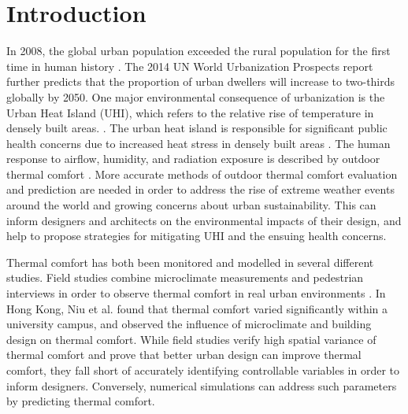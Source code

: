 \documentclass[preprint,3p,12pt,english]{elsarticle}
\begin{document}
\section{Introduction}

In 2008, the global urban population exceeded the rural population for the first time in human history \cite{desa2014world}. The 2014 UN World Urbanization Prospects report further predicts that the proportion of urban dwellers will increase to two-thirds globally by 2050. One major environmental consequence of urbanization is the Urban Heat Island (UHI), which refers to the relative rise of temperature in densely built areas. \cite{kim1992urban, oke1981canyon, oke1973city, bornstein1968observations}. The urban heat island is responsible for significant public health concerns due to increased heat stress in densely built areas \cite{tan2010urban, lo2003land, mavrogianni2011comfort}. The human response to airflow, humidity, and radiation exposure is described by outdoor thermal comfort \cite{pickup_outdoor_2000}. More accurate methods of outdoor thermal comfort evaluation and prediction are needed in order to address the rise of extreme weather events around the world \cite{katz1992extreme, goswami2006increasing} and growing concerns about urban sustainability. This can inform designers and architects on the environmental impacts of their design, and help to propose strategies for mitigating UHI and the ensuing health concerns.

Thermal comfort has both been monitored and modelled in several different studies. Field studies combine microclimate measurements and pedestrian interviews in order to observe thermal comfort in real urban environments \cite{chow_assessment_2016,lin_thermal_2009,nikolopoulou2001thermal}. In Hong Kong, Niu et al. \cite{niu_new_2015} found that thermal comfort varied significantly within a university campus, and observed the influence of microclimate and building design on thermal comfort.  While field studies verify high spatial variance of thermal comfort and prove that better urban design can improve thermal comfort, they fall short of accurately identifying controllable variables in order to inform designers. Conversely, numerical simulations can address such parameters by predicting thermal comfort. 
\end{document}
